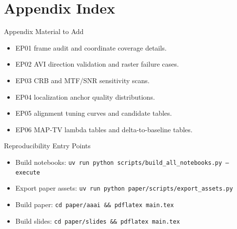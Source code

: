 \appendix
\section{Appendix Index}

\begin{frame}{Appendix Material to Add}
  \begin{itemize}
    \item EP01 frame audit and coordinate coverage details.
    \item EP02 AVI direction validation and raster failure cases.
    \item EP03 CRB and MTF/SNR sensitivity scans.
    \item EP04 localization anchor quality distributions.
    \item EP05 alignment tuning curves and candidate tables.
    \item EP06 MAP-TV lambda tables and delta-to-baseline tables.
  \end{itemize}
\end{frame}

\begin{frame}{Reproducibility Entry Points}
  \begin{itemize}
    \item Build notebooks: \texttt{uv run python scripts/build\_all\_notebooks.py --execute}
    \item Export paper assets: \texttt{uv run python paper/scripts/export\_assets.py}
    \item Build paper: \texttt{cd paper/aaai \&\& pdflatex main.tex}
    \item Build slides: \texttt{cd paper/slides \&\& pdflatex main.tex}
  \end{itemize}
\end{frame}

